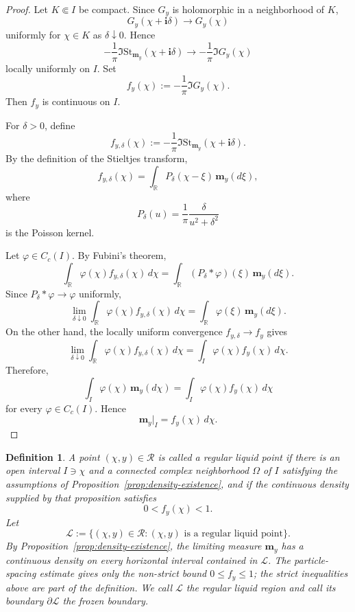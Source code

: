 \documentclass[11pt]{amsart}
\theoremstyle{plain}
\newtheorem{definition}[theorem]{Definition}
\numberwithin{equation}{section}
\numberwithin{theorem}{section}
\numberwithin{figure}{section}
\begin{document}
\begin{proof}
Let \(K\Subset I\) be compact. Since \(G_y\) is holomorphic in a
neighborhood of \(K\),
\[
    G_y(\chi+\mathbf i\delta)
    \longrightarrow
    G_y(\chi)
\]
uniformly for \(\chi\in K\) as \(\delta\downarrow0\). Hence
\[
    -\frac{1}{\pi}
    \Im\mathrm{St}_{\mathbf m_y}(\chi+\mathbf i\delta)
    \longrightarrow
    -\frac{1}{\pi}\Im G_y(\chi)
\]
locally uniformly on \(I\). Set
\[
    f_y(\chi):=-\frac{1}{\pi}\Im G_y(\chi).
\]
Then \(f_y\) is continuous on \(I\).

For \(\delta>0\), define
\[
    f_{y,\delta}(\chi)
    :=
    -\frac{1}{\pi}
    \Im\mathrm{St}_{\mathbf m_y}(\chi+\mathbf i\delta).
\]
By the definition of the Stieltjes transform,
\[
    f_{y,\delta}(\chi)
    =
    \int_{\mathbb R}
    P_\delta(\chi-\xi)\,\mathbf m_y(d\xi),
\]
where
\[
    P_\delta(u)
    =
    \frac{1}{\pi}\frac{\delta}{u^2+\delta^2}
\]
is the Poisson kernel.

Let \(\varphi\in C_c(I)\). By Fubini's theorem,
\[
    \int_{\mathbb R}
    \varphi(\chi)f_{y,\delta}(\chi)\,d\chi
    =
    \int_{\mathbb R}
    (P_\delta*\varphi)(\xi)\,\mathbf m_y(d\xi).
\]
Since \(P_\delta*\varphi\to\varphi\) uniformly,
\[
    \lim_{\delta\downarrow0}
    \int_{\mathbb R}
    \varphi(\chi)f_{y,\delta}(\chi)\,d\chi
    =
    \int_{\mathbb R}\varphi(\xi)\,\mathbf m_y(d\xi).
\]
On the other hand, the locally uniform convergence
\(f_{y,\delta}\to f_y\) gives
\[
    \lim_{\delta\downarrow0}
    \int_{\mathbb R}
    \varphi(\chi)f_{y,\delta}(\chi)\,d\chi
    =
    \int_I\varphi(\chi)f_y(\chi)\,d\chi.
\]
Therefore,
\[
    \int_I\varphi(\chi)\,\mathbf m_y(d\chi)
    =
    \int_I\varphi(\chi)f_y(\chi)\,d\chi
\]
for every \(\varphi\in C_c(I)\). Hence
\[
    \mathbf m_y|_I=f_y(\chi)\,d\chi.
\]
\end{proof}

\begin{definition}\label{df28}
A point $(\chi,y)\in\mathcal R$ is called a \emph{regular liquid
point} if there is an open interval $I\ni\chi$ and a connected complex
neighborhood $\Omega$ of $I$ satisfying the assumptions of
Proposition~\ref{prop:density-existence}, and if the continuous density
supplied by that proposition satisfies
\[
    0<f_y(\chi)<1.
\]
Let
\[
    \mathcal L
    :=
    \{(\chi,y)\in\mathcal R:(\chi,y)\text{ is a regular liquid point}\}.
\]
By Proposition~\ref{prop:density-existence}, the limiting measure
$\mathbf m_y$ has a continuous density on every horizontal interval
contained in $\mathcal L$. The particle-spacing estimate gives only the
non-strict bound $0\leq f_y\leq1$; the strict inequalities above are part
of the definition. We call $\mathcal L$ the regular liquid region and
call its boundary $\partial\mathcal L$ the frozen boundary.

\end{definition}
\end{document}
